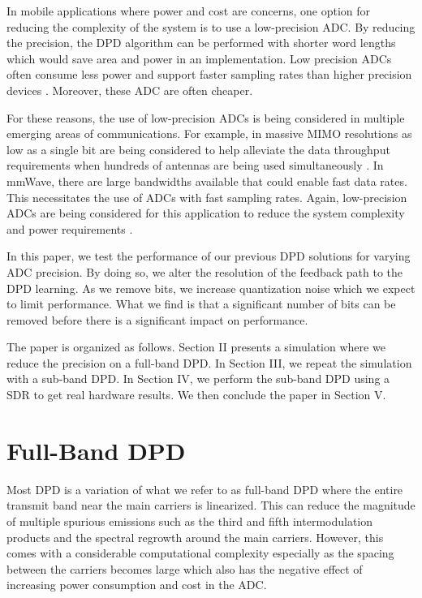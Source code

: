 \documentclass[conference]{IEEEtran}
\begin{document}
In mobile applications where power and cost are concerns, one option for reducing the complexity of the system is to use a low-precision ADC. 
By reducing the precision, the DPD algorithm can be performed with shorter word lengths which would save area and power in an implementation. 
Low precision ADCs often consume less power and support faster sampling rates than higher precision devices \cite{Walden99}. Moreover, these ADC are often cheaper. 

For these reasons, the use of low-precision ADCs is being considered in multiple emerging areas of communications. For example, in massive MIMO resolutions as low as a single bit are being considered to help alleviate the data throughput requirements when hundreds of antennas are being used simultaneously \cite{MIMOAdcs}. In mmWave, there are large bandwidths available that could enable fast data rates. This necessitates the use of ADCs with fast sampling rates. Again, low-precision ADCs are being considered for this application to reduce the system complexity and power requirements \cite{Heath2015}. 

In this paper, we test the performance of our previous DPD solutions for varying ADC precision. 
By doing so, we alter the resolution of the feedback path to the DPD learning. 
As we remove bits, we increase quantization noise which we expect to limit performance. 
What we find is that a significant number of bits can be removed before there is a significant impact on performance.

The paper is organized as follows. 
Section II presents a simulation where we reduce the precision on a full-band DPD. 
In Section III, we repeat the simulation with a sub-band DPD. 
In Section IV, we perform the sub-band DPD using a SDR to get real hardware results.
We then conclude the paper in Section V.

\section{Full-Band DPD}

Most DPD is a variation of what we refer to as full-band DPD where the entire transmit band near the main carriers is linearized. 
This can reduce the magnitude of multiple spurious emissions such as the third and fifth intermodulation products and the spectral regrowth around the main carriers. 
However, this comes with a considerable computational complexity especially as the spacing between the carriers becomes large \cite{TMTT_SubbandDPD} which also has the negative effect of increasing power consumption and cost in the ADC.
\end{document}
